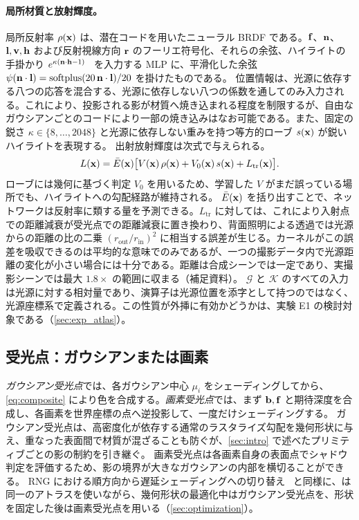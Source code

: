 \paragraph{局所材質と放射輝度。}
局所反射率 $\rho(\mathbf{x})$ は、潜在コードを用いたニューラル BRDF である。$\mathbf{f}$、$\mathbf{n}$、$\mathbf{l},\mathbf{v},\mathbf{h}$ および反射視線方向 $\mathbf{r}$ のフーリエ符号化、それらの余弦、ハイライトの手掛かり $e^{\kappa(\mathbf{n}\cdot\mathbf{h}-1)}$~\cite{zeng2023nrhints} を入力する MLP に、平滑化した余弦 $\psi(\mathbf{n}\cdot\mathbf{l})=\operatorname{softplus}(20\,\mathbf{n}\cdot\mathbf{l})/20$ を掛けたものである。
位置情報は、光源に依存する八つの応答を混合する、光源に依存しない八つの係数を通してのみ入力される。これにより、投影される影が材質へ焼き込まれる程度を制限するが、自由なガウシアンごとのコードにより一部の焼き込みはなお可能である。また、固定の鋭さ $\kappa\in\{8,\dots,2048\}$ と光源に依存しない重みを持つ等方的ローブ $s(\mathbf{x})$ が鋭いハイライトを表現する。
出射放射輝度は次式で与えられる。
\begin{equation}
  L(\mathbf{x})=\bar E(\mathbf{x})\big[V(\mathbf{x})\,\rho(\mathbf{x})+V_0(\mathbf{x})\,s(\mathbf{x})+L_{\mathrm{tr}}(\mathbf{x})\big].
  \label{eq:radiance}
\end{equation}
ローブには幾何に基づく判定 $V_0$ を用いるため、学習した $V$ がまだ誤っている場所でも、ハイライトへの勾配経路が維持される。
$\bar E(\mathbf{x})$ を括り出すことで、ネットワークは反射率に類する量を予測できる。$L_{\mathrm{tr}}$ に対しては、これにより入射点での距離減衰が受光点での距離減衰に置き換わり、背面照明による透過では光源からの距離の比の二乗 $(r_{\mathrm{out}}/r_{\mathrm{in}})^2$ に相当する誤差が生じる。カーネルがこの誤差を吸収できるのは平均的な意味でのみであるが、一つの撮影データ内で光源距離の変化が小さい場合には十分である。距離は合成シーンでは一定であり、実撮影シーンでは最大 $1.8\times$ の範囲に収まる（補足資料）。
$\mathcal G$ と $\mathcal K$ のすべての入力は光源に対する相対量であり、演算子は光源位置を添字として持つのではなく、光源座標系で定義される。この性質が外挿に有効かどうかは、実験 E1 の検討対象である（\cref{sec:exp_atlas}）。

\subsection{受光点：ガウシアンまたは画素}
\label{sec:receivers}
\emph{ガウシアン受光点}では、各ガウシアン中心 $\mu_i$ をシェーディングしてから、\cref{eq:composite} により色を合成する。\emph{画素受光点}では、まず $\mathbf{b},\mathbf{f}$ と期待深度を合成し、各画素を世界座標の点へ逆投影して、一度だけシェーディングする。
ガウシアン受光点は、高密度化が依存する通常のラスタライズ勾配を幾何形状に与え、重なった表面間で材質が混ざることも防ぐが、\cref{sec:intro} で述べたプリミティブごとの影の制約を引き継ぐ。
画素受光点は各画素自身の表面点でシャドウ判定を評価するため、影の境界が大きなガウシアンの内部を横切ることができる。
RNG における順方向から遅延シェーディングへの切り替え~\cite{fan2025rng} と同様に、\ours は同一のアトラスを使いながら、幾何形状の最適化中はガウシアン受光点を、形状を固定した後は画素受光点を用いる（\cref{sec:optimization}）。
